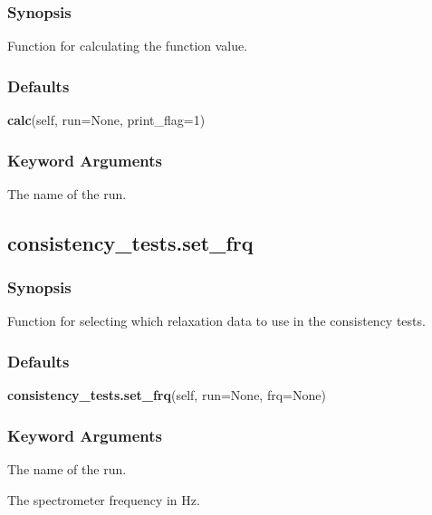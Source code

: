   
 \subsubsection{Synopsis} 

 Function for calculating the function value. 
  

  
 \subsubsection{Defaults} 

 \textsf{\textbf{calc}(self, run=None, print\_flag=1)} 

  
 \subsubsection{Keyword Arguments} 

   The name of the run.  

  

  

 \newpage 

 \subsection{consistency\_tests.set\_frq} 

  
 \subsubsection{Synopsis} 

 Function for selecting which relaxation data to use in the consistency tests. 
  

  
 \subsubsection{Defaults} 

 \textsf{\textbf{consistency\_tests.set\_frq}(self, run=None, frq=None)} 

  
 \subsubsection{Keyword Arguments} 

   The name of the run.   

   The spectrometer frequency in Hz.  

  

